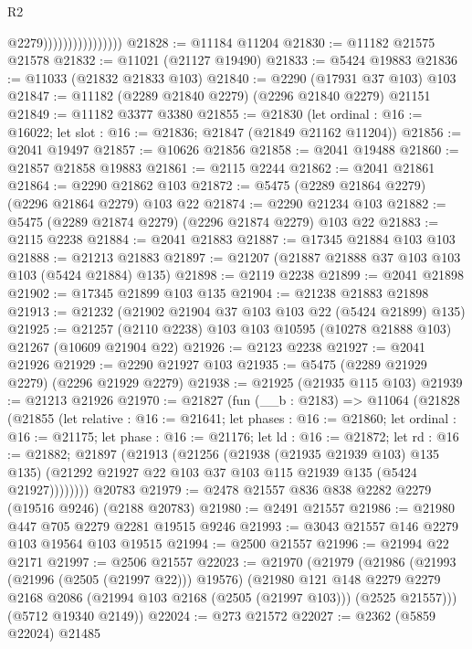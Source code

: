 \begin{lexlean}{R2}
\begin{coremodule}
                                    @2279))))))))))))))))
@21828 := @11184 @11204
@21830 := @11182 @21575 @21578
@21832 := @11021 (@21127 @19490)
@21833 := @5424 @19883
@21836 := @11033 (@21832 @21833 @103)
@21840 := @2290 (@17931 @37 @103) @103
@21847 := @11182 (@2289 @21840 @2279) (@2296 @21840 @2279) @21151
@21849 := @11182 @3377 @3380
@21855 := @21830
    (let ordinal : @16 := @16022; let slot : @16 := @21836; @21847 (@21849 @21162 @11204))
@21856 := @2041 @19497
@21857 := @10626 @21856
@21858 := @2041 @19488
@21860 := @21857 @21858 @19883
@21861 := @2115 @2244
@21862 := @2041 @21861
@21864 := @2290 @21862 @103
@21872 := @5475 (@2289 @21864 @2279) (@2296 @21864 @2279) @103 @22
@21874 := @2290 @21234 @103
@21882 := @5475 (@2289 @21874 @2279) (@2296 @21874 @2279) @103 @22
@21883 := @2115 @2238
@21884 := @2041 @21883
@21887 := @17345 @21884 @103 @103
@21888 := @21213 @21883
@21897 := @21207 (@21887 @21888 @37 @103 @103 @103 (@5424 @21884) @135)
@21898 := @2119 @2238
@21899 := @2041 @21898
@21902 := @17345 @21899 @103 @135
@21904 := @21238 @21883 @21898
@21913 := @21232 (@21902 @21904 @37 @103 @103 @22 (@5424 @21899) @135)
@21925 := @21257 (@2110 @2238) @103 @103 @10595 (@10278 @21888 @103) @21267 (@10609 @21904 @22)
@21926 := @2123 @2238
@21927 := @2041 @21926
@21929 := @2290 @21927 @103
@21935 := @5475 (@2289 @21929 @2279) (@2296 @21929 @2279)
@21938 := @21925 (@21935 @115 @103)
@21939 := @21213 @21926
@21970 := @21827
    (fun (__b : @2183) =>
    @11064
      (@21828
        (@21855
          (let relative : @16 := @21641;
          let phases : @16 := @21860;
          let ordinal : @16 := @21175;
          let phase : @16 := @21176;
          let ld : @16 := @21872;
          let rd : @16 := @21882;
          @21897
            (@21913
              (@21256
                (@21938 (@21935 @21939 @103) @135 @135)
                (@21292 @21927 @22 @103 @37 @103 @115 @21939 @135 (@5424 @21927))))))))
    @20783
@21979 := @2478 @21557 @836 @838 @2282 @2279 (@19516 @9246) (@2188 @20783)
@21980 := @2491 @21557
@21986 := @21980 @447 @705 @2279 @2281 @19515 @9246
@21993 := @3043 @21557 @146 @2279 @103 @19564 @103 @19515
@21994 := @2500 @21557
@21996 := @21994 @22 @2171
@21997 := @2506 @21557
@22023 := @21970
    (@21979
      (@21986
        (@21993 (@21996 (@2505 (@21997 @22))) @19576)
        (@21980
          @121
          @148
          @2279
          @2279
          @2168
          @2086
          (@21994 @103 @2168 (@2505 (@21997 @103)))
          (@2525 @21557)))
      (@5712 @19340 @2149))
@22024 := @273 @21572
@22027 := @2362 (@5859 @22024) @21485

\end{coremodule}
\end{lexlean}
